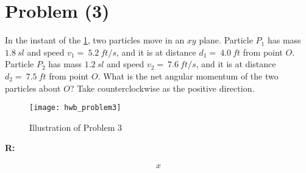 \section{Problem (3)}

	In the instant of the \cref{fig:hwb_problem3}, two particles move in an $xy$ plane. Particle $P_{1}$ has mass $1.8 \ sl$ and speed $v_{1} = \ 5.2 \ ft/s$, and it is at distance $d_{1} = \ 4.0 \ ft$ from point $O$. Particle $P_{2}$ has mass $1.2 \ sl$ and speed $v_{2} = \ 7.6 \ ft/s$, and it is at distance $d_{2} = \ 7.5 \ ft$ from point $O$. What is the net angular momentum of the two particles about $O$? Take counterclockwise as the positive direction.

	\begin{figure}[H]
		\begin{center}
			\texttt{[image: hwb\_problem3]}
			\caption{Illustration of Problem 3}
			\label{fig:hwb_problem3}
		\end{center}
	\end{figure}

	\textbf{R:}

	\begin{align}
		x
	\end{align}
